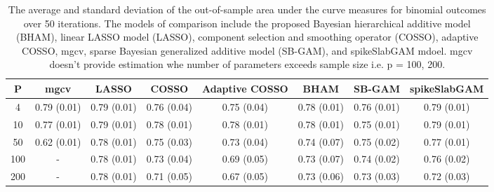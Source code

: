 \begin{table}[ht]
\centering
\begin{tabular}{cccccccc}
  \hline
P & mgcv & LASSO & COSSO & Adaptive COSSO & BHAM & SB-GAM & spikeSlabGAM \\ 
  \hline
  4 & 0.79 (0.01) & 0.79 (0.01) & 0.76 (0.04) & 0.75 (0.04) & 0.78 (0.01) & 0.76 (0.01) & 0.79 (0.01) \\ 
   10 & 0.77 (0.01) & 0.79 (0.01) & 0.78 (0.01) & 0.78 (0.01) & 0.78 (0.01) & 0.75 (0.01) & 0.79 (0.01) \\ 
   50 & 0.62 (0.01) & 0.78 (0.01) & 0.75 (0.03) & 0.73 (0.04) & 0.74 (0.07) & 0.75 (0.02) & 0.77 (0.01) \\ 
  100 & - & 0.78 (0.01) & 0.73 (0.04) & 0.69 (0.05) & 0.73 (0.07) & 0.74 (0.02) & 0.76 (0.02) \\ 
  200 & - & 0.78 (0.01) & 0.71 (0.05) & 0.67 (0.05) & 0.73 (0.06) & 0.73 (0.03) & 0.72 (0.03) \\ 
   \hline
\end{tabular}
\caption{The average and standard deviation of the out-of-sample area under the curve measures
    for binomial outcomes over 50 iterations. The models of comparison include the proposed
    Bayesian hierarchical additive model (BHAM), linear LASSO model (LASSO), component
    selection and smoothing operator (COSSO), adaptive COSSO, mgcv, sparse Bayesian
    generalized additive model (SB-GAM), and spikeSlabGAM mdoel. mgcv doesn't provide
    estimation whe number of parameters exceeds sample size i.e. p = 100, 200.} 
\label{tab:lnr_bin_auc}
\end{table}
